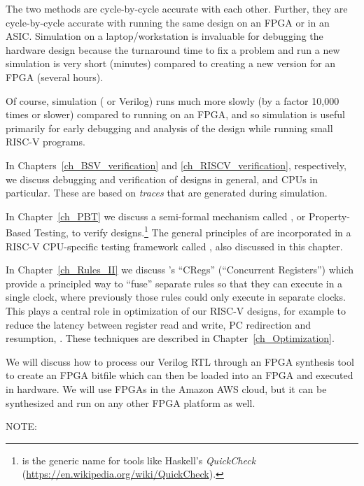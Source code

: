 The two methods are cycle-by-cycle accurate with each other.  Further,
they are cycle-by-cycle accurate with running the same design on an
FPGA or in an ASIC.  Simulation on a laptop/workstation is invaluable
for debugging the hardware design because the turnaround time to fix a
problem and run a new simulation is very short (minutes) compared to
creating a new version for an FPGA (several hours).

Of course, simulation ({\BLUESIM} or Verilog) runs much more slowly
(by a factor 10,000 times or slower) compared to running on an FPGA,
and so simulation is useful primarily for early debugging and analysis
of the design while running small RISC-V programs.

In Chapters~\ref{ch_BSV_verification} and \ref{ch_RISCV_verification},
respectively, we discuss debugging and verification of {\BSV} designs
in general, and CPUs in particular.  These are based on \emph{traces}
that are generated during simulation.

In Chapter~\ref{ch_PBT} we discuss a semi-formal mechanism called
{\PBT}, or Property-Based Testing, to verify designs.\footnote{{\PBT}
is the generic name for tools like Haskell's \emph{QuickCheck}
(\url{https://en.wikipedia.org/wiki/QuickCheck}).}  The general
principles of {\PBT} are incorporated in a RISC-V CPU-specific testing
framework called {\TESTRIG}, also discussed in this chapter.

In Chapter~\ref{ch_Rules_II} we discuss {\BSV}'s ``CRegs''
(``Concurrent Registers'') which provide a principled way to ``fuse''
separate rules so that they can execute in a single clock, where
previously those rules could only execute in separate clocks.  This
plays a central role in optimization of our RISC-V designs, for
example to reduce the latency between register read and write, PC
redirection and resumption, {\etc}.  These techniques are described in
Chapter~\ref{ch_Optimization}.

We will discuss how to process our Verilog RTL through an FPGA
synthesis tool to create an FPGA bitfile which can then be loaded into
an FPGA and executed in hardware.  We will use FPGAs in the Amazon AWS
cloud, but it can be synthesized and run on any other FPGA platform as
well.

\vspace{1ex}

NOTE: 

